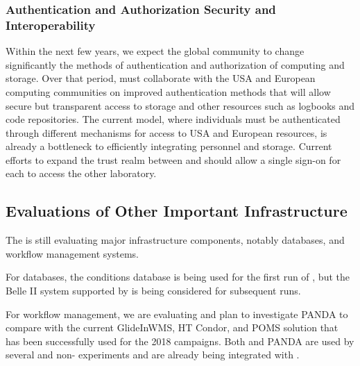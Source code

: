 \subsubsection{Authentication and Authorization Security and Interoperability}\label{ch-comp-auth}

Within the next few years, we expect the global  community to change significantly the methods of authentication and authorization of computing and storage. 
Over that period,  must collaborate with the USA and European  computing communities on improved authentication methods  that will allow secure but transparent access to storage and other resources such as logbooks and code repositories.  The current model, where individuals must be authenticated through different mechanisms for access to USA and European resources, is already a bottleneck to efficiently integrating personnel and storage. 
Current efforts to expand the trust realm between  and  should allow a single sign-on for each to access the other laboratory.


\subsection{Evaluations of Other Important Infrastructure}

The   is still evaluating major infrastructure components, notably databases, and workflow management systems.

For databases\cite{Laycock:2019ynk}, the  conditions database is being used for the first run of , but the Belle II\cite{Ritter:2018jxh} system supported by  is being considered for subsequent runs. 

For workflow management, we are evaluating \cite{Falabella:2016waj} and plan to investigate PANDA\cite{Megino:2017ywl} to compare with the current GlideInWMS, HT Condor, and POMS solution that has been successfully used for the 2018  campaigns.
Both  and PANDA are used by several  and non- experiments and are already being integrated with . 
